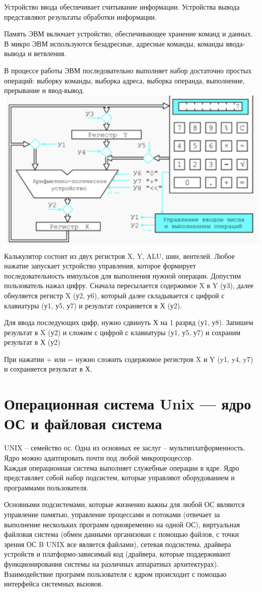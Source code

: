 \documentclass{article}
\begin{document}
Устройство ввода обеспечивает считывание информации. 
Устройства вывода представляют результаты обработки информации. 

Память ЭВМ включает устройство, обеспечивающее хранение команд и данных.
В микро ЭВМ используются безадресные, адресные команды, команды ввода-вывода и ветвления.


В процессе работы ЭВМ последовательно выполняет набор достаточно простых операций: 
выборку команды, выборка адреса, выборка операнда, выполнение, прерывание и ввод-вывод.
\\
\includegraphics[width=.5\textwidth]{calc.png}\\

Калькулятор состоит из двух регистров X, Y, ALU, шин, вентелей. Любое нажатие запускает устройство управления, которое формирует последовательность импульсов для выполнения нужной операции. Допустим пользователь нажал цифру. 
Сначала пересылается содержимое X в Y (у3), далее обнуляется регистр X (у2, у6), который далее складывается с цифрой с клавиатуры (у1, у5, у7) и результат сохраняется в Х (у2).


Для ввода последующих цифр, нужно сдвинуть Х на 1 разряд (у1, у8). Запишем результат в X (у2) и сложим с цифрой с клавиатуры (у1, у5, у7) и сохраним результат в Х (у2)


При нажатии + или = нужно сложить содержимое регистров X и Y (y1, y4, y7) и сохраняется результат в Х.




\section{Операционная система Unix — ядро ОС и файловая система}
UNIX – семейство ос. Одна из основных ее заслуг – мультиплатформенность. Ядро можно адаптировать почти под любой микропроцессор.\\
Каждая операционная система выполняет служебные операции в ядре. Ядро представляет собой набор подсистем, которые управляют оборудованием и программами пользователя.


Основными подсистемами, которые жизненно важны для любой ОС являются управление памятью, управление процессами и потоками (отвечает за выполнение нескольких программ одновременно на одной ОС), 
виртуальная файловая система (обмен данными организован с помощью файлов, с точки зрения ОС B UNIX все является файлами), 
сетевая подсистема, драйвера устройств и платформо-зависимый код (драйвера, которые поддерживают функционирования системы на различных аппаратных архитектурах). 
Взаимодействие программ пользователя с ядром происходит с помощью интерфейса системных вызовов.
\end{document}

